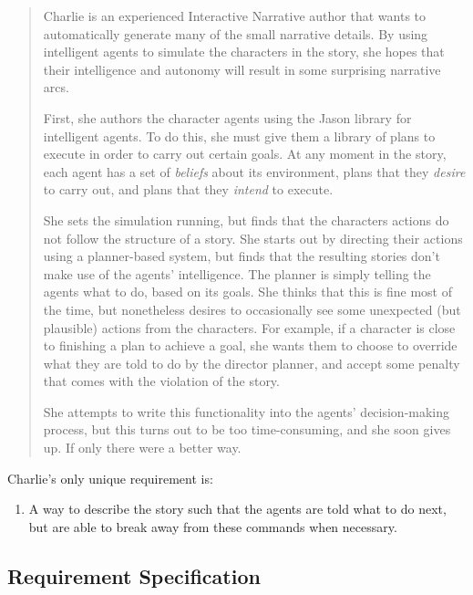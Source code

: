 \documentclass[11pt]{report}
\begin{document}
\begin{quote}
  Charlie is an experienced Interactive Narrative author that wants to
  automatically generate many of the small narrative details. By using
  intelligent agents to simulate the characters in the story, she hopes that
  their intelligence and autonomy will result in some surprising narrative arcs.

  First, she authors the character agents using the Jason library for
  intelligent agents. To do this, she must give them a library of plans to
  execute in order to carry out certain goals. At any moment in the story, each agent has a set of
  \emph{beliefs} about its environment, plans that they \emph{desire} to carry
  out, and plans that they \emph{intend} to execute.

  She sets the simulation running, but finds that the characters actions do not
  follow the structure of a story. She starts out by directing their actions using a planner-based system, but
  finds that the resulting stories don't make use of the agents' intelligence.
  The planner is simply telling the agents what to do, based on its goals. She
  thinks that this is fine most of the time, but nonetheless desires to
  occasionally see some unexpected (but plausible) actions from the characters.
  For example, if a character is close to finishing a plan to achieve a goal,
  she wants them to  choose to override what they are told to do by the director
  planner, and accept some penalty that comes with the violation of the story.

  She attempts to write this functionality into the agents' decision-making
  process, but this turns out to be too time-consuming, and she soon gives up.
  If only there were a better way.
\end{quote}

Charlie's only unique requirement is:

\begin{enumerate}[{Charlie} R1.]
  \item A way to describe the story such that the agents are told what to do
    next, but are able to break away from these commands when necessary.\label{req:charlie1}
\end{enumerate}

\subsection{Requirement Specification}
\label{sec:requirements}
\end{document}
